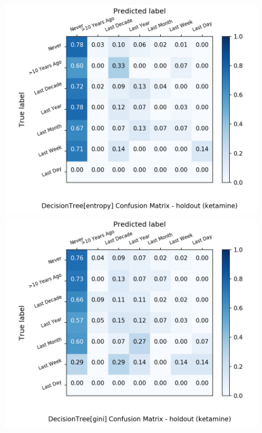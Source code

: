 \begin{figure}[H]
	\centering
	\begin{minipage}[b]{0.32\textwidth}
		\includegraphics[width=1.1\textwidth]{Plots/drugs/ketamine_DecisionTree_entropy_balance_False_holdout.png}
	\end{minipage}
	\begin{minipage}[b]{0.32\textwidth}
		\includegraphics[width=1.1\textwidth]{Plots/drugs/ketamine_DecisionTree_gini_balance_False_holdout.png}
	\end{minipage}

\end{figure}
